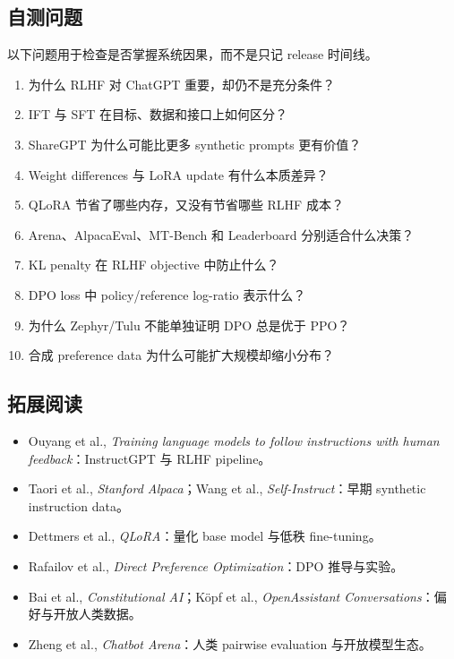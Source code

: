 \documentclass[a4paper]{article}
\begin{document}
\subsection{自测问题}

以下问题用于检查是否掌握系统因果，而不是只记 release 时间线。

\begin{enumerate}
  \item 为什么 RLHF 对 ChatGPT 重要，却仍不是充分条件？
  \item IFT 与 SFT 在目标、数据和接口上如何区分？
  \item ShareGPT 为什么可能比更多 synthetic prompts 更有价值？
  \item Weight differences 与 LoRA update 有什么本质差异？
  \item QLoRA 节省了哪些内存，又没有节省哪些 RLHF 成本？
  \item Arena、AlpacaEval、MT-Bench 和 Leaderboard 分别适合什么决策？
  \item KL penalty 在 RLHF objective 中防止什么？
  \item DPO loss 中 policy/reference log-ratio 表示什么？
  \item 为什么 Zephyr/Tulu 不能单独证明 DPO 总是优于 PPO？
  \item 合成 preference data 为什么可能扩大规模却缩小分布？
\end{enumerate}

\subsection{拓展阅读}

\begin{itemize}
  \item Ouyang et al., \emph{Training language models to follow instructions with human feedback}：InstructGPT 与 RLHF pipeline。
  \item Taori et al., \emph{Stanford Alpaca}；Wang et al., \emph{Self-Instruct}：早期 synthetic instruction data。
  \item Dettmers et al., \emph{QLoRA}：量化 base model 与低秩 fine-tuning。
  \item Rafailov et al., \emph{Direct Preference Optimization}：DPO 推导与实验。
  \item Bai et al., \emph{Constitutional AI}；Köpf et al., \emph{OpenAssistant Conversations}：偏好与开放人类数据。
  \item Zheng et al., \emph{Chatbot Arena}：人类 pairwise evaluation 与开放模型生态。
\end{itemize}
\end{document}
